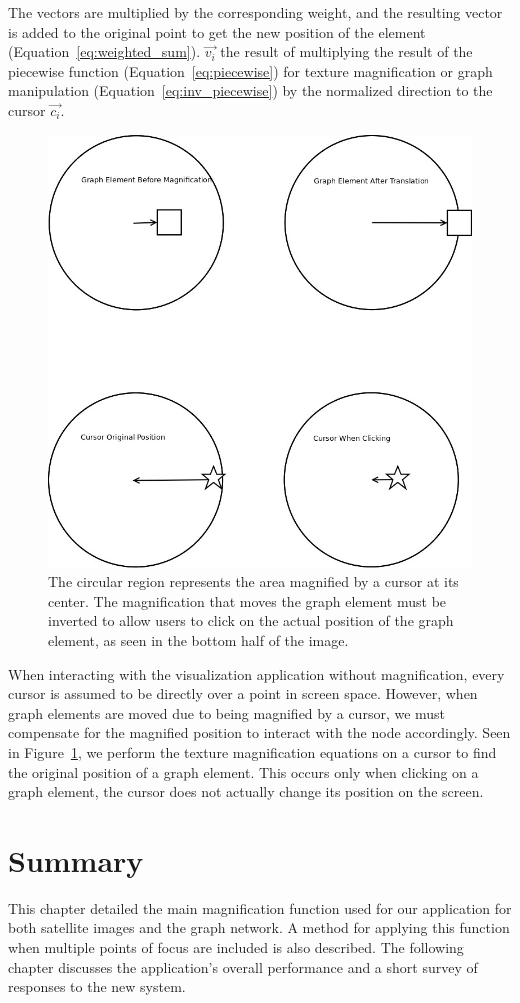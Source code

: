 The vectors are multiplied by the corresponding weight, and the resulting vector is added to the original point
to get the new position of the element (Equation~\ref{eq:weighted_sum}). $\vec{v_i}$ the result of multiplying
the result of the piecewise function (Equation~\ref{eq:piecewise}) for texture magnification or graph manipulation
(Equation~\ref{eq:inv_piecewise}) by the normalized direction to the cursor $\vec{c_i}$.

\begin{figure}[htp] \centering
    \includegraphics[width=0.6\linewidth]{img/clicking.jpg}
    \caption[Interacting with Magnified Elements]{The circular region represents the area magnified by a cursor at its center. The magnification that moves the graph element must be inverted to allow users to click on the actual position of the graph element, as seen in the bottom half of the image.}
    \label{fig:clicking}
\end{figure}

When interacting with the visualization application without magnification, every cursor is assumed to be directly over a point in screen space. However, when graph elements are moved due to being magnified by a cursor, we must compensate for the magnified position to interact with the node accordingly. Seen in Figure~\ref{fig:clicking}, we perform the texture magnification equations on a cursor to find the original position of a graph element. This occurs only when clicking on a graph
element, the cursor does not actually change its position on the screen.

\section{Summary}
\label{subsection:magnification_summary}

This chapter detailed the main magnification function used for our application for both satellite images and the graph network. A method for applying this function when multiple points of focus are included is also described. The following chapter discusses the application's overall performance and a short survey of responses to the new system.
